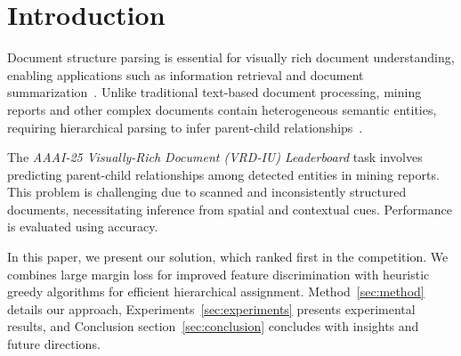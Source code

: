 \section{Introduction}
Document structure parsing is essential for visually rich document understanding, enabling applications such as information retrieval and document summarization~\cite{xu2020layoutlm}. Unlike traditional text-based document processing, mining reports and other complex documents contain heterogeneous semantic entities, requiring hierarchical parsing to infer parent-child relationships~\cite{li2020docbank}.

The \textit{AAAI-25 Visually-Rich Document (VRD-IU) Leaderboard} task involves predicting parent-child relationships among detected entities in mining reports. This problem is challenging due to scanned and inconsistently structured documents, necessitating inference from spatial and contextual cues. Performance is evaluated using accuracy.  


In this paper, we present our solution, which ranked first in the competition. We combines large margin loss for improved feature discrimination with heuristic greedy algorithms for efficient hierarchical assignment. Method~\ref{sec:method} details our approach, Experiments~\ref{sec:experiments} presents experimental results, and Conclusion section~\ref{sec:conclusion} concludes with insights and future directions.  